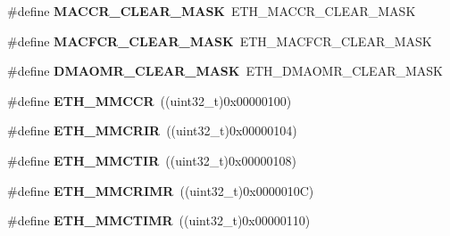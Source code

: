 \begin{DoxyCompactItemize}
\item 
\#define {\bfseries M\+A\+C\+C\+R\+\_\+\+C\+L\+E\+A\+R\+\_\+\+M\+A\+SK}~E\+T\+H\+\_\+\+M\+A\+C\+C\+R\+\_\+\+C\+L\+E\+A\+R\+\_\+\+M\+A\+SK\hypertarget{group___h_a_l___e_t_h___aliased___defines_ga6415e52119d875b78a80ee4186233643}{}\label{group___h_a_l___e_t_h___aliased___defines_ga6415e52119d875b78a80ee4186233643}

\item 
\#define {\bfseries M\+A\+C\+F\+C\+R\+\_\+\+C\+L\+E\+A\+R\+\_\+\+M\+A\+SK}~E\+T\+H\+\_\+\+M\+A\+C\+F\+C\+R\+\_\+\+C\+L\+E\+A\+R\+\_\+\+M\+A\+SK\hypertarget{group___h_a_l___e_t_h___aliased___defines_ga0fc15b5e25134974f3a371c17882e36d}{}\label{group___h_a_l___e_t_h___aliased___defines_ga0fc15b5e25134974f3a371c17882e36d}

\item 
\#define {\bfseries D\+M\+A\+O\+M\+R\+\_\+\+C\+L\+E\+A\+R\+\_\+\+M\+A\+SK}~E\+T\+H\+\_\+\+D\+M\+A\+O\+M\+R\+\_\+\+C\+L\+E\+A\+R\+\_\+\+M\+A\+SK\hypertarget{group___h_a_l___e_t_h___aliased___defines_gad1b188dfe2cdaea68fb36806a0b94b95}{}\label{group___h_a_l___e_t_h___aliased___defines_gad1b188dfe2cdaea68fb36806a0b94b95}

\item 
\#define {\bfseries E\+T\+H\+\_\+\+M\+M\+C\+CR}~((uint32\+\_\+t)0x00000100)\hypertarget{group___h_a_l___e_t_h___aliased___defines_ga340605767fdf406c393f046be44a1e09}{}\label{group___h_a_l___e_t_h___aliased___defines_ga340605767fdf406c393f046be44a1e09}

\item 
\#define {\bfseries E\+T\+H\+\_\+\+M\+M\+C\+R\+IR}~((uint32\+\_\+t)0x00000104)\hypertarget{group___h_a_l___e_t_h___aliased___defines_gaa49af339607e5c30c69d55f4941fd775}{}\label{group___h_a_l___e_t_h___aliased___defines_gaa49af339607e5c30c69d55f4941fd775}

\item 
\#define {\bfseries E\+T\+H\+\_\+\+M\+M\+C\+T\+IR}~((uint32\+\_\+t)0x00000108)\hypertarget{group___h_a_l___e_t_h___aliased___defines_gab53a2a3649b1b96533c3bb8f2dfca221}{}\label{group___h_a_l___e_t_h___aliased___defines_gab53a2a3649b1b96533c3bb8f2dfca221}

\item 
\#define {\bfseries E\+T\+H\+\_\+\+M\+M\+C\+R\+I\+MR}~((uint32\+\_\+t)0x0000010\+C)\hypertarget{group___h_a_l___e_t_h___aliased___defines_ga42e63a205698925c20f69be3d711ae59}{}\label{group___h_a_l___e_t_h___aliased___defines_ga42e63a205698925c20f69be3d711ae59}

\item 
\#define {\bfseries E\+T\+H\+\_\+\+M\+M\+C\+T\+I\+MR}~((uint32\+\_\+t)0x00000110)\hypertarget{group___h_a_l___e_t_h___aliased___defines_gad0e2ddcc50c96772130c9717aa1ec496}{}\label{group___h_a_l___e_t_h___aliased___defines_gad0e2ddcc50c96772130c9717aa1ec496}


\end{DoxyCompactItemize}
